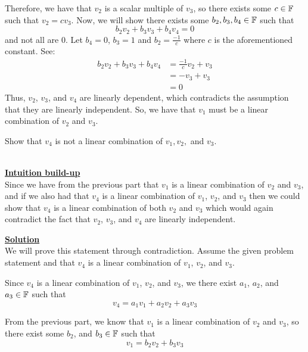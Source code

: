 \documentclass[answers]{exam}
\begin{document}
\begin{questions}
\begin{parts}
\begin{subparts}
\begin{solution}
                Therefore, we have that $v_2$ is a scalar multiple of $v_3$, so there exists some $c\in\mathbb{F}$ such 
                that $v_2 = cv_3$. Now, we will show there exists some $b_2,b_3,b_4\in\mathbb{F}$ such that
                \[
                    b_2v_2 + b_3v_3 + b_4v_4 = 0
                \]
                and not all are $0$. Let $b_4 = 0$, $b_3 = 1$ and $b_2 = \frac{-1}{c}$ where $c$ is the aforementioned constant.
                See:
                \begin{align*}
                    b_2v_2 + b_3v_3 + b_4v_4 &= \frac{-1}{c}v_2 + v_3 \\
                    &= -v_3 + v_3 \\
                    &= 0
                \end{align*}
                Thus, $v_2$, $v_3$, and $v_4$ are linearly dependent, which contradicts the assumption that they
                are linearly independent. So, we have that $v_1$ must be a linear combination of $v_2$ and $v_3$.
            \end{solution}
            \subpart Show that $v_4$ is not a linear combination of $v_1,v_2,$ and $v_3$.
            \begin{solution}\,\\
                \underline{\textbf{Intuition build-up}}\\
                Since we have from the previous part that $v_1$ is a linear combination of $v_2$ and $v_3$, and if
                we also had that $v_4$ is a linear combination of $v_1$, $v_2$, and $v_3$ then we could show that
                $v_4$ is a linear combination of both $v_2$ and $v_3$ which would again contradict the fact that
                $v_2$, $v_3$, and $v_4$ are linearly independent.

                \underline{\textbf{Solution}}\\
                We will prove this statement through contradiction. Assume the given problem statement and that 
                $v_4$ is a linear combination of $v_1$, $v_2$, and $v_3$.

                Since $v_4$ is a linear combination of $v_1$, $v_2$, and $v_3$, we there exist $a_1$, $a_2$, and $a_3\in\mathbb{F}$ such that
                \begin{equation}\label{eq:v4linCom}
                    v_4 = a_1v_1 + a_2v_2 + a_3v_3
                \end{equation}

                From the previous part, we know that $v_1$ is a linear combination of $v_2$ and $v_3$, so there exist some
                $b_2$, and $b_3\in\mathbb{F}$ such that
                \begin{equation}\label{eq:v1linCom2}
                    v_1 = b_2v_2 + b_3v_3
                \end{equation}


\end{solution}
\end{subparts}
\end{parts}
\end{questions}
\end{document}
